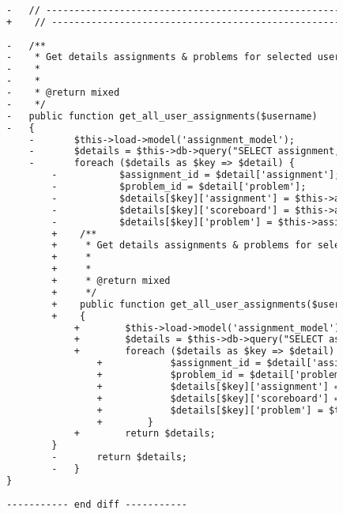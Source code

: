 \begin{lstlisting}[language=diff, caption=Perubahan pada kode Hof\_model.php]
			
			-	// ------------------------------------------------------------------------
			+    // ------------------------------------------------------------------------
			
			-	/**
			-	 * Get details assignments & problems for selected user
			-	 *
			-	 *
			-	 * @return mixed
			-	 */
			-	public function get_all_user_assignments($username)
			-	{
				-		$this->load->model('assignment_model');
				-		$details = $this->db->query("SELECT assignment, problem, CEILING((pre_score * coefficient / 10000)) AS score FROM shj_submissions WHERE is_final=1 AND username='$username' AND file_type!='txt' AND file_type!='pdf' AND file_type!='zip' ORDER BY assignment ASC")->result_array();
				-		foreach ($details as $key => $detail) {
					-			$assignment_id = $detail['assignment'];
					-			$problem_id = $detail['problem'];
					-			$details[$key]['assignment'] = $this->assignment_model->assignment_info($assignment_id)['name'];
					-			$details[$key]['scoreboard'] = $this->assignment_model->assignment_info($assignment_id)['scoreboard'];
					-			$details[$key]['problem'] = $this->assignment_model->problem_info($assignment_id, $problem_id)['name'];
					+    /**
					+     * Get details assignments & problems for selected user
					+     *
					+     *
					+     * @return mixed
					+     */
					+    public function get_all_user_assignments($username)
					+    {
						+        $this->load->model('assignment_model');
						+        $details = $this->db->query("SELECT assignment, problem, CEILING((pre_score * coefficient / 10000)) AS score FROM shj_submissions WHERE is_final=1 AND username='$username' AND file_type!='txt' AND file_type!='pdf' AND file_type!='zip' ORDER BY assignment ASC")->result_array();
						+        foreach ($details as $key => $detail) {
							+            $assignment_id = $detail['assignment'];
							+            $problem_id = $detail['problem'];
							+            $details[$key]['assignment'] = $this->assignment_model->assignment_info($assignment_id)['name'];
							+            $details[$key]['scoreboard'] = $this->assignment_model->assignment_info($assignment_id)['scoreboard'];
							+            $details[$key]['problem'] = $this->assignment_model->problem_info($assignment_id, $problem_id)['name'];
							+        }
						+        return $details;
					}
					-		return $details;
					-	}
			}
			
			----------- end diff -----------
\end{lstlisting}


